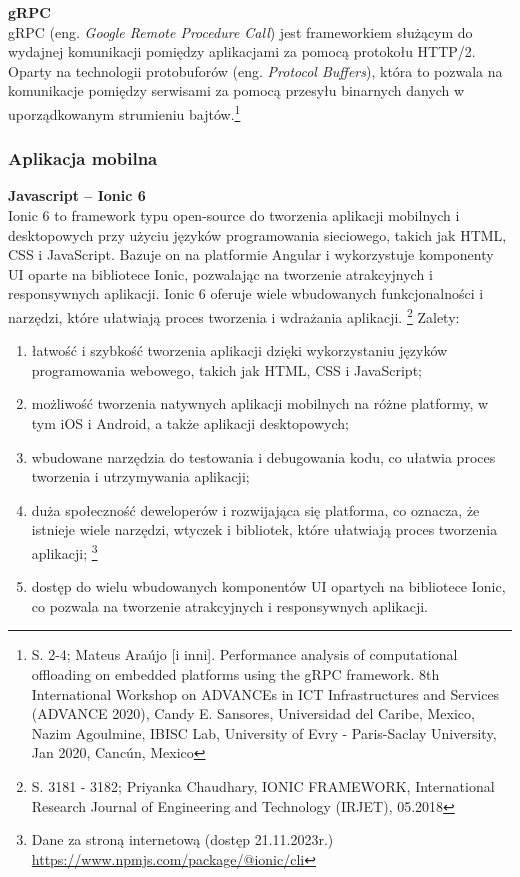 \documentclass[12pt, a4paper, twoside, openany]{book}
\newcommand{\forceindent}{\leavevmode{\parindent=1.3em\indent}}
\begin{document}
\forceindent \textbf{gRPC\\}
\forceindent gRPC (eng. \textit{Google Remote Procedure Call}) jest frameworkiem służącym do wydajnej komunikacji pomiędzy aplikacjami za pomocą protokołu HTTP/2. Oparty na technologii protobuforów (eng. \textit{Protocol Buffers}), która to pozwala na komunikacje pomiędzy serwisami za pomocą przesyłu binarnych danych w uporządkowanym strumieniu bajtów.\footnote{S. 2-4; Mateus Araújo [i inni]. Performance analysis of computational offloading on embedded platforms using the gRPC framework. 8th International Workshop on ADVANCEs in ICT Infrastructures and Services (ADVANCE 2020), Candy E. Sansores, Universidad del Caribe, Mexico, Nazim Agoulmine, IBISC Lab, University of Evry - Paris-Saclay University, Jan 2020, Cancún, Mexico}

\subsubsection{Aplikacja mobilna}

\forceindent \textbf{Javascript -- Ionic 6\\}
\indent Ionic 6 to framework typu open-source do tworzenia aplikacji mobilnych i desktopowych przy użyciu języków programowania sieciowego, takich jak HTML, CSS i JavaScript. Bazuje on na platformie Angular i wykorzystuje komponenty UI oparte na bibliotece Ionic, pozwalając na tworzenie atrakcyjnych i responsywnych aplikacji. Ionic 6 oferuje wiele wbudowanych funkcjonalności i narzędzi, które ułatwiają proces tworzenia i wdrażania aplikacji. \footnote{S. 3181 - 3182; Priyanka Chaudhary, IONIC FRAMEWORK, International Research Journal of Engineering and Technology (IRJET), 05.2018}
Zalety:
\begin{enumerate}[label=--]
    \item łatwość i szybkość tworzenia aplikacji dzięki wykorzystaniu języków programowania webowego, takich jak HTML, CSS i JavaScript;
    \item możliwość tworzenia natywnych aplikacji mobilnych na różne platformy, w tym iOS i Android, a także aplikacji desktopowych;
    \item wbudowane narzędzia do testowania i debugowania kodu, co ułatwia proces tworzenia i utrzymywania aplikacji;
    \item duża społeczność deweloperów i rozwijająca się platforma, co oznacza, że istnieje wiele narzędzi, wtyczek i bibliotek, które ułatwiają proces tworzenia aplikacji; \footnote{Dane za stroną internetową (dostęp 21.11.2023r.) \url{https://www.npmjs.com/package/@ionic/cli}}
    \item dostęp do wielu wbudowanych komponentów UI opartych na bibliotece Ionic, co pozwala na tworzenie atrakcyjnych i responsywnych aplikacji.
\end{enumerate}
\end{document}
